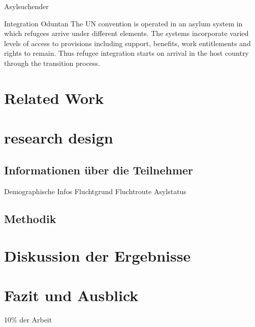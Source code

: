 \documentclass[12pt,oneside]{article}
\begin{document}
Asylsuchender

Integration
Oduntan
The UN convention is operated in an asylum system in
which refugees arrive under different elements. The
systems incorporate varied levels of access to provisions
including support, benefits, work entitlements and rights to
remain. Thus refugee integration starts on arrival in the host
country through the transition process.

\section{Related Work}


\section{research design}

\subsection{Informationen über die Teilnehmer}

Demographische Infos
Fluchtgrund
Fluchtroute
Asylstatus

\subsection{Methodik}




\section{Diskussion der Ergebnisse}

\section{Fazit und Ausblick}

10\% der Arbeit

\clearpage
\lhead{}
\printbibliography
{}


\end{document}
